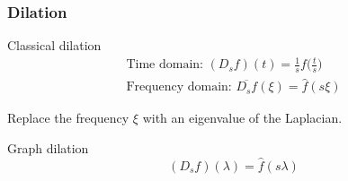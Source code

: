 \documentclass{beamer}
\begin{document}
\begin{frame}
  \frametitle{Dilation}

  \begin{block}{Classical dilation}
    \begin{equation}
      \begin{split}
        \text{Time domain: } (D_s f)(t) = \frac{1}{s} f \bigg( \frac{t}{s} \bigg) \\
        \text{Frequency domain: } \overline{D_s f}(\xi) = \hat{f}(s \xi)
      \end{split}
    \end{equation}
  \end{block}  

  Replace the frequency $\xi$ with an eigenvalue of the Laplacian.
  
  \begin{block}{Graph dilation}
    \begin{equation}
      (D_sf)(\lambda) = \hat{f} (s \lambda)
    \end{equation}
  \end{block}  
\end{frame}
\end{document}
